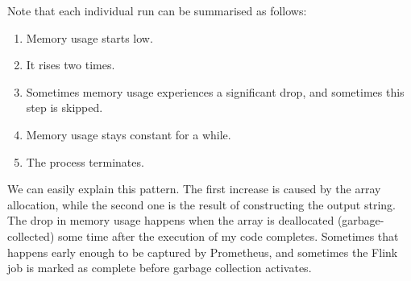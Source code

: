 \documentclass{article}
\begin{document}
Note that each individual run can be summarised as follows:
\begin{enumerate}
\item Memory usage starts low.
\item It rises two times.
\item Sometimes memory usage experiences a significant drop, and sometimes this
  step is skipped.
\item Memory usage stays constant for a while.
\item The process terminates.
\end{enumerate}
We can easily explain this pattern. The first increase is caused by the array
allocation, while the second one is the result of constructing the output
string. The drop in memory usage happens when the array is deallocated
(garbage-collected) some time after the execution of my code completes.
Sometimes that happens early enough to be captured by Prometheus, and sometimes
the Flink job is marked as complete before garbage collection activates.
\end{document}
